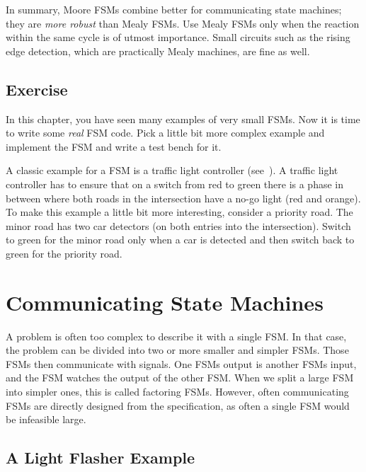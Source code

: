 \documentclass[%
    10pt,
    headinclude, footexclude,
    openright, %
    notitlepage,
    cleardoubleempty,
    headsepline,
    pointlessnumbers,
    bibtotoc, idxtotoc,
    ]{scrbook}
\newcommand{\todo}[1]{{\emph{TODO: #1}}}
\renewcommand{\todo}[1]{}
\begin{document}
In summary, Moore FSMs combine better for communicating state machines; they
are \emph{more robust} than Mealy FSMs. Use Mealy FSMs only when the reaction within the same
cycle is of utmost importance. Small circuits such as the rising edge detection,
which are practically Mealy machines, are fine as well.

\section{Exercise}

In this chapter, you have seen many examples of very small FSMs.
Now it is time to write some \emph{real} FSM code.
Pick a little bit more complex example and implement the FSM and
write a test bench for it.

A classic example for a FSM is a traffic light controller (see~\cite[Section~14.3]{dally:vhdl:2016}).
A traffic light controller has to ensure that on a switch from red to green
there is a phase in between where both roads in the intersection
have a no-go light (red and orange).
To make this example a little bit more interesting, consider a priority road.
The minor road has two car detectors (on both entries into the intersection).
Switch to green for the minor road only when a car is detected and then switch
back to green for the priority road.

\todo{Luca: Greatest common divisor with Euclide algorithm can be also a nice exercise.
Martin: but this is shown at the Chisel homepage without an FSM.}

\todo{Here a more interesting exercise. And not one from Dally.}

\chapter{Communicating State Machines}

A problem is often too complex to describe it with a single FSM.
In that case, the problem can be divided into two or more smaller and simpler FSMs.
Those FSMs then communicate with signals. One FSMs output is
another FSMs input, and the FSM watches the output of the other FSM.
When we split a large FSM into simpler ones, this is called factoring FSMs.
However, often communicating FSMs are directly designed from the specification,
as often a single FSM would be infeasible large.

\section{A Light Flasher Example}
\end{document}
